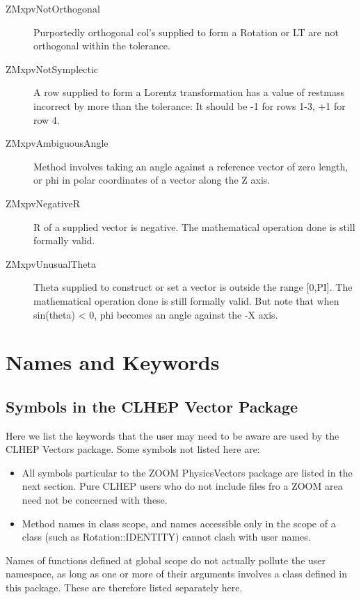 \documentclass[twoside,12pt]{article}
\begin{document}
\begin{description} 
\item [ZMxpvNotOrthogonal]
Purportedly orthogonal col's supplied
to form a Rotation or LT are not
orthogonal within the tolerance.
\item [ZMxpvNotSymplectic]
A row supplied to form a Lorentz
transformation has a value of restmass
incorrect by more than the tolerance:
It should be -1 for rows 1-3,
+1 for row 4.
\item [ZMxpvAmbiguousAngle]
Method involves taking an angle against
a reference vector of zero length, or
phi in polar coordinates of a vector
along the Z axis.
\item [ZMxpvNegativeR]
R of a supplied vector is negative.
The mathematical operation done is
still formally valid.
\item [ZMxpvUnusualTheta]
Theta supplied to construct or set
a vector is outside the range [0,PI].
The mathematical operation done is
still formally valid.  But note that
when sin(theta) < 0, phi becomes an
angle against the -X axis.
\end{description}


\newpage
\section{Names and Keywords}

\subsection {Symbols in the CLHEP Vector Package} 

Here we list the keywords that the user may need to be aware are used by the 
CLHEP Vectors package.  Some symbols not listed here are:

\begin{itemize}
\item
All symbols particular to the ZOOM PhysicsVectors package are listed in 
the next section.  Pure CLHEP users who do not include files fro a ZOOM 
area need not be concerned with these.

\item
Method names in class scope, and names accessible only in the scope of a
class (such as Rotation::IDENTITY) cannot clash with user names.
\end{itemize}

Names of functions defined at global scope do not actually pollute the user
namespace, as long as one or more of their arguments involves a class
defined in this package.  These are therefore listed separately here.
\end{document}
